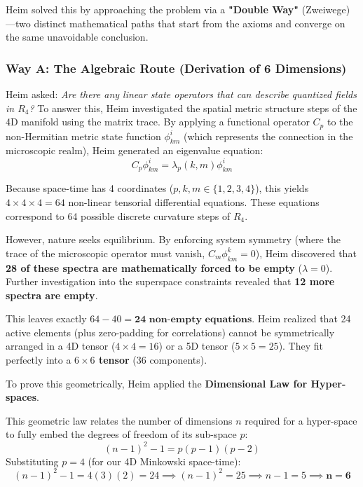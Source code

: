 \documentclass[11pt,a4paper,oneside]{article}
\begin{document}
Heim solved this by approaching the problem via a \textbf{"Double Way"} (Zweiwege)—two distinct mathematical paths that start from the axioms and converge on the same unavoidable conclusion. 

\subsubsection{Way A: The Algebraic Route (Derivation of 6 Dimensions)}

Heim asked: \textit{Are there any linear state operators that can describe quantized fields in \texorpdfstring{$R_4$}{R4}?} 
To answer this, Heim investigated the spatial metric structure steps of the 4D manifold using the matrix trace. By applying a functional operator $C_p$ to the non-Hermitian metric state function $\phi_{km}^i$ (which represents the connection in the microscopic realm), Heim generated an eigenvalue equation:
\begin{equation}
    C_p \phi_{km}^i = \lambda_p(k,m) \phi_{km}^i
\end{equation}

Because space-time has 4 coordinates ($p, k, m \in \{1,2,3,4\}$), this yields $4 \times 4 \times 4 = 64$ non-linear tensorial differential equations. These equations correspond to 64 possible discrete curvature steps of $R_4$.

However, nature seeks equilibrium. By enforcing system symmetry (where the trace of the microscopic operator must vanish, $C_m \phi_{km}^k = 0$), Heim discovered that \textbf{28 of these spectra are mathematically forced to be empty} ($\lambda = 0$). Further investigation into the superspace constraints revealed that \textbf{12 more spectra are empty}. 

This leaves exactly $64 - 40 = \textbf{24 non-empty equations}$. 
Heim realized that 24 active elements (plus zero-padding for correlations) cannot be symmetrically arranged in a 4D tensor ($4 \times 4 = 16$) or a 5D tensor ($5 \times 5 = 25$). They fit perfectly into a \textbf{$6 \times 6$ tensor} (36 components). 

To prove this geometrically, Heim applied the \textbf{Dimensional Law for Hyper-spaces}.

\begin{tcolorbox}[colback=white, colframe=theoryblue, title=\textbf{The Dimensional Law for Hyper-Spaces}]
This geometric law relates the number of dimensions $n$ required for a hyper-space to fully embed the degrees of freedom of its sub-space $p$:
\begin{equation}
    (n-1)^2 - 1 = p(p-1)(p-2)
\end{equation}
Substituting $p=4$ (for our 4D Minkowski space-time):
\begin{equation*}
    (n-1)^2 - 1 = 4(3)(2) = 24 \implies (n-1)^2 = 25 \implies n-1 = 5 \implies \mathbf{n = 6}
\end{equation*}
\end{tcolorbox}
\end{document}
